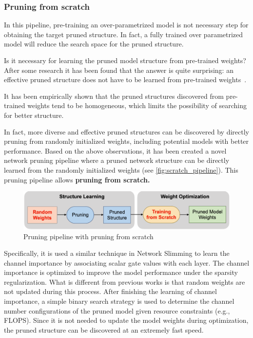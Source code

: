\subsubsection{Pruning from scratch}
In this pipeline, pre-training an over-parametrized model is not necessary
step for obtaining the target pruned structure. In fact, a fully trained
over parametrized model will reduce the search space for the pruned structure.

Is it necessary for learning the pruned model structure from pre-trained
weights?
After some research it has been found that the answer is quite surprising: an
effective pruned structure does not have to be learned from pre-trained
weights~\cite{Wang_2020}.

It has been empirically shown that the pruned structures discovered from
pre-trained weights tend to be homogeneous, which limits the possibility of
searching for better structure.

In  fact, more diverse and effective pruned structures can be discovered by
directly pruning from randomly initialized weights, including  potential models
with better performance. Based  on  the  above  observations, it has been
created a novel network pruning pipeline where a pruned network structure can
be directly learned from the randomly initialized weights (see
\autoref{fig:scratch_pipeline}). This pruning pipeline allows \textbf{pruning
from scratch.}

\begin{figure}[ht]
    \includegraphics[width=\textwidth]{images/pruning/scratch_pipeline.png}
    \centering
    \caption{Pruning pipeline with pruning from scratch}\label{fig:scratch_pipeline}
\end{figure}

Specifically, it is used a similar technique in Network Slimming to learn the
channel importance by associating scalar gate values with each layer.
The channel importance is optimized to improve the model performance under the
sparsity regularization.
What is different from previous works is that random weights are not updated
during this process. After finishing the learning of channel importance, a
simple binary search strategy is used to determine the channel number
configurations of the pruned model given resource constraints (e.g., FLOPS).
Since it is not needed to update the model weights during optimization, the
pruned structure can be discovered at an extremely fast speed.

